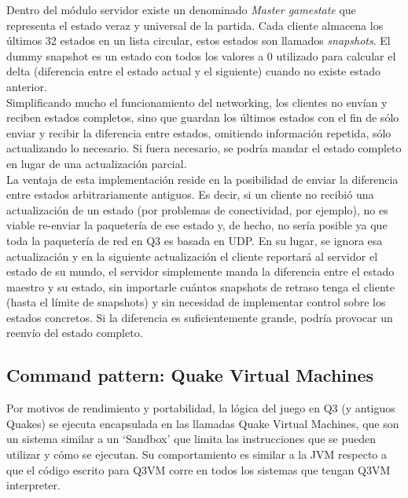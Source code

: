 \documentclass[a4paper,12pt]{report}
\begin{document}
	Dentro del módulo servidor existe un denominado \textit{Master gamestate} que representa el estado veraz y universal de la partida. Cada cliente almacena los últimos 32 estados en un lista circular, estos estados son llamados \textit{snapshots}. El dummy snapshot es un estado con todos los valores a 0 utilizado para calcular el delta (diferencia entre el estado actual y el siguiente) cuando no existe estado anterior.\\
	
	Simplificando mucho el funcionamiento del networking, los clientes no envían y reciben estados completos, sino que guardan los últimos estados con el fin de sólo enviar y recibir la diferencia entre estados, omitiendo información repetida, sólo actualizando lo necesario. Si fuera necesario, se podría mandar el estado completo en lugar de una actualización parcial.\\
	
	La ventaja de esta implementación reside en la posibilidad de enviar la diferencia entre estados arbitrariamente antiguos. Es decir, si un cliente no recibió una actualización de un estado (por problemas de conectividad, por ejemplo), no es viable re-enviar la paquetería de ese estado y, de hecho, no sería posible ya que toda la paquetería de red en Q3 es basada en UDP. En su lugar, se ignora esa actualización y en la siguiente actualización el cliente reportará al servidor el estado de su mundo, el servidor simplemente manda la diferencia entre el estado maestro y su estado, sin importarle cuántos snapshots de retraso tenga el cliente (hasta el límite de snapshots) y sin necesidad de implementar control sobre los estados concretos. Si la diferencia es suficientemente grande, podría provocar un reenvío del estado completo.\\

	\subsection{Command pattern: Quake Virtual Machines}
	
	Por motivos de rendimiento y portabilidad, la lógica del juego en Q3 (y antiguos Quakes) se ejecuta encapsulada en las llamadas Quake Virtual Machines, que son un sistema similar a un `Sandbox' que limita las instrucciones que se pueden utilizar y cómo se ejecutan. Su comportamiento es similar a la JVM respecto a que el código escrito para Q3VM corre en todos los sistemas que tengan Q3VM interpreter. \cite{q3vm}\\
	
\end{document}
